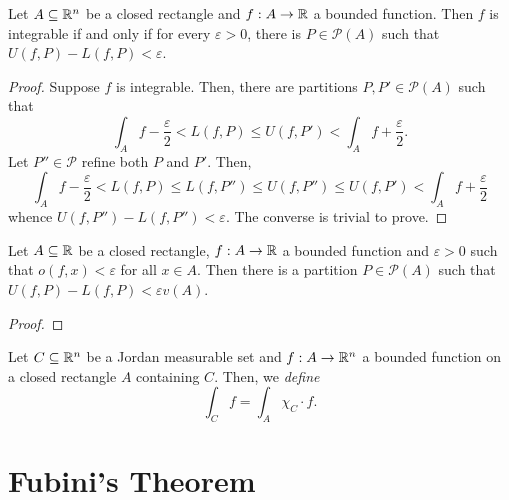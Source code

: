 \begin{proposition}
    Let $A\subseteq\mathbb{R}^n$ be a closed rectangle and $f: A\to\mathbb{R}$ a bounded function. Then $f$ is integrable if and only if for every $\varepsilon > 0$, there is $P\in\mathscr P(A)$ such that $U(f,P) - L(f,P) < \varepsilon$.
\end{proposition}
\begin{proof}
    Suppose $f$ is integrable. Then, there are partitions $P,P'\in\mathscr P(A)$ such that 
    \begin{equation*}
        \int_A f - \frac{\varepsilon}{2} < L(f,P)\le U(f,P') < \int_A f + \frac{\varepsilon}{2}.
    \end{equation*}
    Let $P''\in\mathscr P$ refine both $P$ and $P'$. Then, 
    \begin{equation*}
        \int_A f - \frac{\varepsilon}{2} < L(f,P)\le L(f,P'')\le U(f,P'')\le U(f,P') < \int_A f + \frac{\varepsilon}{2}
    \end{equation*}
    whence $U(f,P'') - L(f,P'') < \varepsilon$. The converse is trivial to prove.
\end{proof}

\begin{lemma}
    Let $A\subseteq\mathbb{R}$ be a closed rectangle, $f: A\to\mathbb{R}$ a bounded function and $\varepsilon > 0$ such that $o(f, x) < \varepsilon$ for all $x\in A$. Then there is a partition $P\in\mathscr P(A)$ such that $U(f,P) - L(f,P) < \varepsilon v(A)$.
\end{lemma}
\begin{proof}
\end{proof}

\begin{definition}
    Let $C\subseteq\mathbb{R}^n$ be a Jordan measurable set and $f: A\to\mathbb{R}^n$ a bounded function on a closed rectangle $A$ containing $C$. Then, we \emph{define} 
    \begin{equation*}
        \int_C f = \int_A \chi_C\cdot f.
    \end{equation*}
\end{definition}

\section{Fubini's Theorem}

